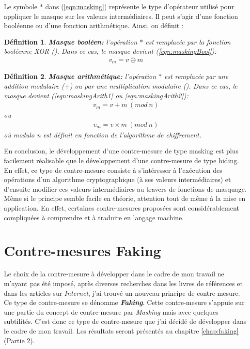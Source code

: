 \documentclass[oneside]{book}
\newtheorem{definition}{Définition}[section]
\begin{document}
\hspace{-0.5cm}Le symbole $*$ dans (\ref{eqn:masking}) représente le type d'opérateur utilisé pour appliquer le masque sur les valeurs intermédiaires. Il peut s'agir d'une fonction booléenne ou d'une fonction arithmétique. Ainsi, on définit : 

\theoremstyle{definition}
\begin{definition}{\textbf{Masque booléen:}}
l'opération $*$ est remplacée par la fonction booléenne XOR (\oplus). Dans ce cas, le masque devient (\ref{eqn:maskingBool}):
\begin{gather}
	v_m = v \oplus m\label{eqn:maskingBool}
\end{gather}
\end{definition}
\theoremstyle{definition}
\begin{definition}{\textbf{Masque arithmétique:}}
l'opération $*$ est remplacée par une addition modulaire ($+$) ou par une multiplication modulaire (\times ). Dans ce cas, le masque devient (\ref{eqn:maskingArith1} ou \ref{eqn:maskingArith2}): 
\begin{gather}
	v_m = v + m \ (mod \ n)\label{eqn:maskingArith1}
\end{gather}
ou
\begin{gather}
	v_m = v \times m \ (mod \ n)\label{eqn:maskingArith2}
\end{gather}
où \textit{modulo n} est définit en fonction de l'algorithme de chiffrement.
\end{definition}

En conclusion, le développement d'une contre-mesure de type masking est plus facilement réalisable que le développement d'une contre-mesure de type hiding. En effet, ce type de contre-mesure consiste à s'intéresser à l'exécution des opérations d'un algorithme cryptographique (à ses valeurs intermédiaires) et d'ensuite modifier ces valeurs intermédiaires au travers de fonctions de masquage. Même si le principe semble facile en théorie, attention tout de même à la mise en application. En effet, certaines contre-mesures proposées sont considérablement compliquées à comprendre et à traduire en langage machine.

\section{Contre-mesures Faking}
\label{sec:faking}

Le choix de la contre-mesure à développer dans le cadre de mon travail ne m'ayant pas été imposé, après diverses recherches dans les livres de références et dans les articles sur \textit{Internet}, j'ai trouvé un nouveau principe de contre-mesure. Ce type de contre-mesure se dénomme \textbf{\textit{Faking}}. Cette contre-mesure s'appuie sur une partie du concept de contre-mesure par \textit{Masking} mais avec quelques subtilités. C'est donc ce type de contre-mesure que j'ai décidé de développer dans le cadre de mon travail. Les résultats seront présentés au chapitre \ref{chap:faking} (Partie 2).
\end{document}
